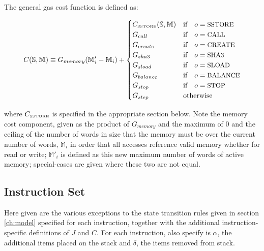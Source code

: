 \documentclass[9pt,oneside]{amsart}
\begin{document}
The general gas cost function is defined as:

\begin{equation}
C(\mathbb{S}, \mathbb{M}) \equiv G_{memory}(\mathbb{M}'_i - \mathbb{M}_i) + \begin{cases}
C_\text{\tiny SSTORE}(\mathbb{S}, \mathbb{M}) & \text{if} \quad o = \text{\small SSTORE} \\
G_{call} & \text{if} \quad o = \text{\small CALL}\\
G_{create} & \text{if} \quad o = \text{\small CREATE}\\
G_{sha3} & \text{if} \quad o = \text{\small SHA3}\\
G_{sload} & \text{if} \quad o = \text{\small SLOAD}\\
G_{balance} & \text{if} \quad o = \text{\small BALANCE}\\
G_{stop} & \text{if} \quad o = \text{\small STOP}\\
G_{step} & \text{otherwise}
\end{cases}
\end{equation}

where $C_\text{\tiny SSTORE}$ is specified in the appropriate section below. Note the memory cost component, given as the product of $G_{memory}$ and the maximum of 0 and the ceiling of the number of words in size that the memory must be over the current number of words, $\mathbb{M}_i$ in order that all accesses reference valid memory whether for read or write; $\mathbb{M}'_i$ is defined as this new maximum number of words of active memory; special-cases are given where these two are not equal.

\subsection{Instruction Set}

Here given are the various exceptions to the state transition rules given in section \ref{ch:model} specified for each instruction, together with the additional instruction-specific definitions of $J$ and $C$. For each instruction, also specify is $\alpha$, the additional items placed on the stack and $\delta$, the items removed from stack.
\end{document}
